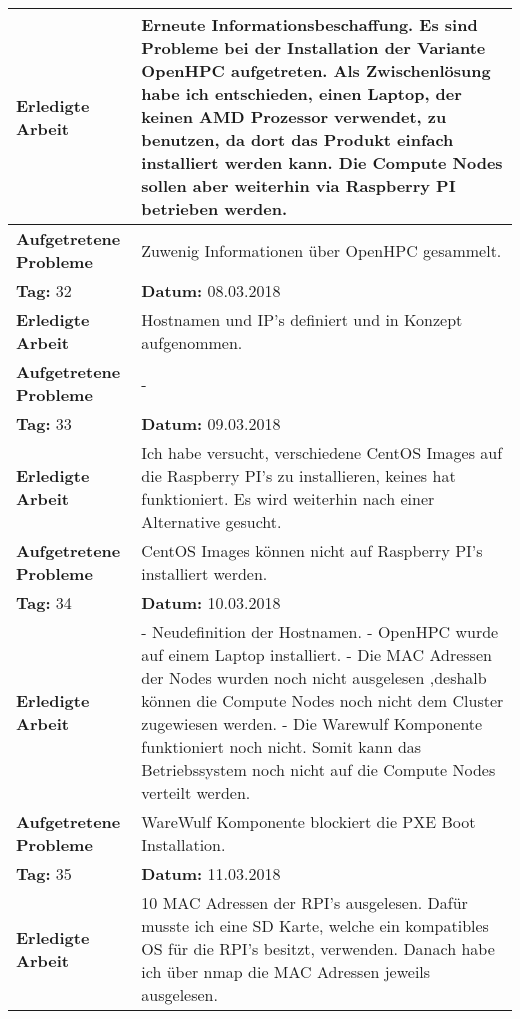 \begin{longtable}{|p{5cm}|p{5cm}p{6cm}|}
\textbf{Erledigte Arbeit} & \multicolumn{2}{p{11cm}|}{Erneute Informationsbeschaffung. Es sind Probleme bei der Installation der Variante OpenHPC aufgetreten. Als Zwischenlösung habe ich entschieden, einen Laptop, der keinen AMD Prozessor verwendet, zu benutzen, da dort das Produkt einfach installiert werden kann. Die Compute Nodes sollen aber weiterhin via Raspberry PI betrieben werden.} \\ \hline
\textbf{Aufgetretene Probleme} & \multicolumn{2}{p{11cm}|}{Zuwenig Informationen über OpenHPC gesammelt.} \\ \hline
\rowcolor{heading}\textbf{Tag:} 32 & \textbf{Datum:} 08.03.2018 & \\ \hline
\textbf{Erledigte Arbeit} & \multicolumn{2}{p{11cm}|}{Hostnamen und IP's definiert und in Konzept aufgenommen.} \\ \hline
\textbf{Aufgetretene Probleme} & \multicolumn{2}{p{11cm}|}{-} \\ \hline
\rowcolor{heading}\textbf{Tag:} 33 & \textbf{Datum:} 09.03.2018 & \\ \hline
\textbf{Erledigte Arbeit} & \multicolumn{2}{p{11cm}|}{Ich habe versucht, verschiedene CentOS Images auf die Raspberry PI's zu installieren, keines hat funktioniert. Es wird weiterhin nach einer Alternative gesucht.} \\ \hline
\textbf{Aufgetretene Probleme} & \multicolumn{2}{p{11cm}|}{CentOS Images können nicht auf Raspberry PI's installiert werden.} \\ \hline
\rowcolor{heading}\textbf{Tag:} 34 & \textbf{Datum:} 10.03.2018 & \\ \hline
\textbf{Erledigte Arbeit} & \multicolumn{2}{p{11cm}|}{- Neudefinition der Hostnamen. \newline
- OpenHPC wurde auf einem Laptop installiert. \newline
- Die MAC Adressen der Nodes wurden noch nicht ausgelesen ,deshalb können die Compute Nodes noch nicht dem Cluster zugewiesen werden. \newline
- Die Warewulf Komponente funktioniert noch nicht. Somit kann das Betriebssystem noch nicht auf die Compute Nodes verteilt werden.} \\ \hline
\textbf{Aufgetretene Probleme} & \multicolumn{2}{p{11cm}|}{WareWulf Komponente blockiert die PXE Boot Installation.} \\ \hline
\rowcolor{heading}\textbf{Tag:} 35 & \textbf{Datum:} 11.03.2018 & \\ \hline
\textbf{Erledigte Arbeit} & \multicolumn{2}{p{11cm}|}{10 MAC Adressen der RPI's ausgelesen. Dafür musste ich eine SD Karte, welche ein kompatibles OS für die RPI's besitzt, verwenden. Danach habe ich über nmap die MAC Adressen jeweils ausgelesen.} \\ \hline

\end{longtable}
